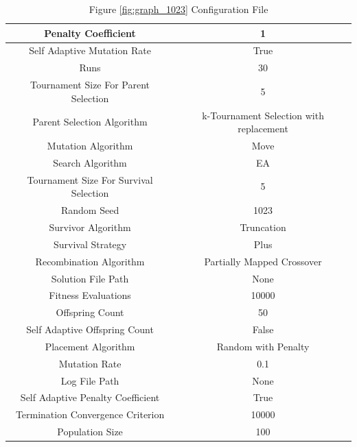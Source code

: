 \documentclass{standalone}
\begin{document}
\begin{table}[!htb]
	\centering
	\caption{Figure \ref{fig:graph_1023} Configuration File}
	\label{tab:graph_1023}
	\begin{tabular}{| c | c |}
		\hline
		Penalty Coefficient		& 1		 \\
		\hline
		Self Adaptive Mutation Rate		& True		 \\
		\hline
		Runs		& 30		 \\
		\hline
		Tournament Size For Parent Selection		& 5		 \\
		\hline
		Parent Selection Algorithm		& k-Tournament Selection with replacement		 \\
		\hline
		Mutation Algorithm		& Move		 \\
		\hline
		Search Algorithm		& EA		 \\
		\hline
		Tournament Size For Survival Selection		& 5		 \\
		\hline
		Random Seed		& 1023		 \\
		\hline
		Survivor Algorithm		& Truncation		 \\
		\hline
		Survival Strategy		& Plus		 \\
		\hline
		Recombination Algorithm		& Partially Mapped Crossover		 \\
		\hline
		Solution File Path		& None		 \\
		\hline
		Fitness Evaluations		& 10000		 \\
		\hline
		Offspring Count		& 50		 \\
		\hline
		Self Adaptive Offspring Count		& False		 \\
		\hline
		Placement Algorithm		& Random with Penalty		 \\
		\hline
		Mutation Rate		& 0.1		 \\
		\hline
		Log File Path		& None		 \\
		\hline
		Self Adaptive Penalty Coefficient		& True		 \\
		\hline
		Termination Convergence Criterion		& 10000		 \\
		\hline
		Population Size		& 100		 \\
		\hline
	\end{tabular}
\end{table}
\end{document}
